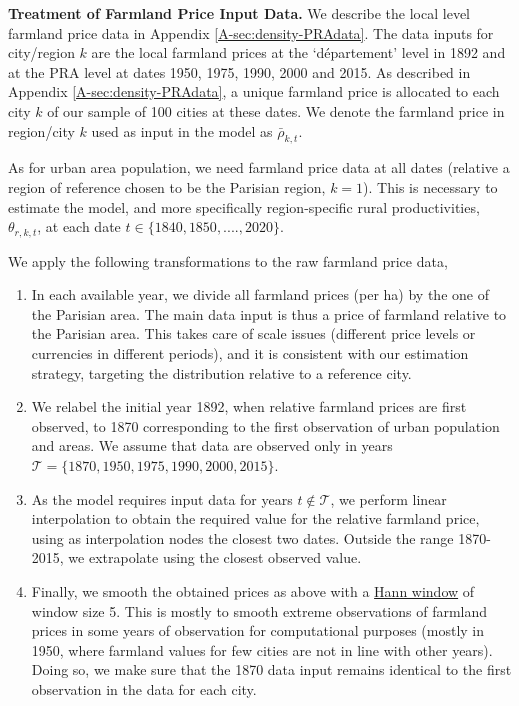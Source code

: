 \documentclass[11pt]{report}
\begin{document}
\textbf{Treatment of Farmland Price Input Data.} We describe the local level farmland price data in Appendix  \ref{A-sec:density-PRAdata}. The data inputs for city/region $k$ are the local farmland prices at the `département' level in 1892 and at the PRA level at dates 1950, 1975, 1990, 2000 and 2015. As described in Appendix \ref{A-sec:density-PRAdata}, a unique farmland price is allocated to each city $k$ of our sample of 100 cities at these dates. We denote the farmland price in region/city $k$ used as input in the model as $\bar{\rho}_{k,t}$. 

As for urban area population, we need farmland price data at all dates (relative a region of reference chosen to be the Parisian region, $k=1$). This is necessary to estimate the model, and more specifically region-specific rural productivities, $\theta_{r,k,t}$, at each date $t \in \{1840, 1850, ...., 2020\}$.

We apply the following transformations to the raw farmland price data,

\begin{enumerate}
	\item In each available year, we divide all farmland prices (per ha) by the one of the Parisian area. The main data input is thus a price of farmland relative to the Parisian area. This takes care of scale issues (different price levels or currencies in different periods), and it is consistent with our estimation strategy, targeting the distribution relative to a reference city.
	\item We relabel the initial year 1892, when relative farmland prices are first observed, to 1870 corresponding to the first observation of urban population and areas. We assume that data are observed only in years $\mathcal{T}=\{ 1870, 1950, 1975, 1990, 2000, 2015\}$.
	\item As the model requires input data for years $t \notin \mathcal{T}$, we perform linear interpolation to obtain the required value for the relative farmland price, using as interpolation nodes the closest two dates. Outside the range 1870-2015, we extrapolate using the closest observed value.
	\item Finally, we smooth the obtained prices as above with a \href{https://en.wikipedia.org/wiki/Hann_function}{Hann window} of window size 5. This is mostly to smooth extreme observations of farmland prices in some years of observation  for computational purposes (mostly in 1950, where farmland values for few cities are not in line with other years). Doing so, we make sure that the 1870 data input remains identical to the first observation in the data for each city.
\end{enumerate}
\end{document}

